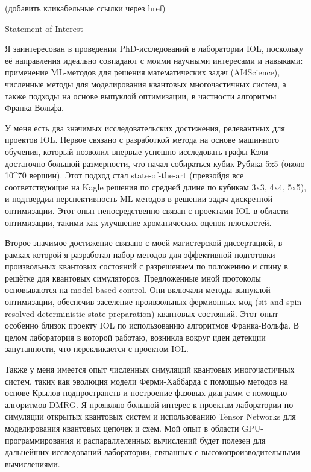 (добавить кликабельные ссылки через href)

Statement of Interest

Я заинтересован в проведении PhD-исследований в лаборатории IOL, поскольку её направления идеально совпадают с моими научными интересами и навыками: применение ML-методов для решения математических задач (AI4Science), численные методы для моделирования квантовых многочастичных систем, а также подходы на основе выпуклой оптимизации, в частности алгоритмы Франка-Вольфа.

У меня есть два значимых исследовательских достижения, релевантных для проектов IOL. Первое связано с разработкой метода на основе машинного обучения, который позволил впервые успешно исследовать графы Кэли достаточно большой размерности, что начал собираться кубик Рубика 5x5 (около 10^70 вершин). Этот подход стал state-of-the-art (превзойдя все соответствующие на Kagle решения по средней длине по кубикам 3x3, 4x4, 5x5), и подтвердил перспективность ML-методов в решении задач дискретной оптимизации. Этот опыт непосредственно связан с проектами IOL в области оптимизации, такими как улучшение хроматических оценок плоскостей.

Второе значимое достижение связано с моей магистерской диссертацией, в рамках которой я разработал набор методов для эффективной подготовки произвольных квантовых состояний с разрешением по положению и спину в решётке для квантовых симуляторов. Предложенные мной протоколы основываются на model-based control. Они включали методы выпуклой оптимизации, обеспечив заселение проивзольных фермионных мод (sit and spin resolved deterministic state preparation) квантовых состояний. Этот опыт особенно близок проекту IOL по использованию алгоритмов Франка-Вольфа. В целом лаборатория в которой работаю, возникла вокруг идеи детекции запутанности, что перекликается с проектом IOL.

Также у меня имеется опыт численных симуляций квантовых многочастичных систем, таких как эволюция модели Ферми-Хаббарда с помощью методов на основе Крылов-подпространств и построение фазовых диаграмм с помощью алгоритмов DMRG. Я проявляю большой интерес к проектам лаборатории по симуляции открытых квантовых систем и использованию Tensor Networks для моделирования квантовых цепочек и схем. Мой опыт в области GPU-программирования и распараллеленных вычислений будет полезен для дальнейших исследований лаборатории, связанных с высокопроизводительными вычислениями.

